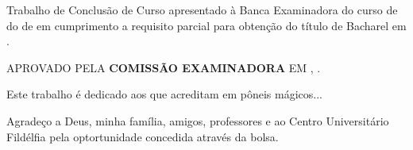 \documentclass[12pt,openright,oneside,a4paper,english,spanish,brazil]{unifil}
\begin{document}
\begin{folhadeaprovacao}
	\begin{center}
		\ABNTEXchapterfont\textbf{\MakeTextUppercase{\imprimirautor}}
		\vspace*{2cm}
		\begin{center}
			\ABNTEXchapterfont\large\textbf{\MakeTextUppercase{\imprimirtitulo}}
		\end{center}
		\vspace*{2cm}
		Trabalho de Conclusão de Curso apresentado à Banca Examinadora do curso de \imprimirpreambulo do \imprimirinstituicao de \imprimirlocal em cumprimento a requisito parcial para obtenção do título de Bacharel em \imprimirpreambulo.
		\par
		\vspace*{.5in}
		\hspace{.6\textwidth}
		\begin{minipage}{.6\textwidth}
			\begin{center}
\MakeTextUppercase{Aprovado pela \textbf{COMISSÃO EXAMINADORA} em \imprimirlocal, \imprimirdata.}
			\end{center}
		\end{minipage}
			\vspace*{\fill}
	\end{center}
\end{folhadeaprovacao}


\begin{epigrafe}
\vspace*{\fill}
\begin{flushright}
Este trabalho é dedicado aos que acreditam em pôneis mágicos...
\end{flushright}
\end{epigrafe}


\begin{agradecimentos}

Agradeço a Deus, minha família, amigos, professores e ao Centro Universitário Fildélfia pela optortunidade concedida através da bolsa.
\end{agradecimentos}


\end{document}
